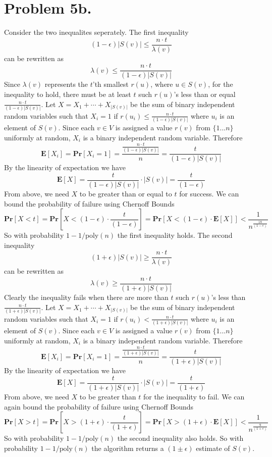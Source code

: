 \documentclass[12pt]{article}
\begin{document}
\section*{Problem 5b.}
Consider the two inequalites seperately. The first inequality
$$ (1-\epsilon)|S(v)| \le \frac{n\cdot t}{\lambda(v)} $$
can be rewritten as
$$ \lambda(v) \le \frac{n\cdot t}{(1-\epsilon)|S(v)|} $$
Since $\lambda(v)$ represents the $t$'th smallest $r(u)$, where $u \in S(v)$,
for the inequality to hold, there must be at least $t$ such
$r(u)$'s less than or equal $\frac{n\cdot t}{(1-\epsilon)|S(v)|}$. Let
$X = X_1 + \cdots + X_{|S(v)|}$ be the sum of binary independent random variables
such that $X_i = 1$ if $r(u_i) \le \frac{n\cdot t}{(1-\epsilon)|S(v)|}$ where
$u_i$ is an element of $S(v)$. Since each $v \in V$ is assigned a value $r(v)$
from $\{1...n\}$ uniformly at random, $X_i$ is a binary independent random
variable. Therefore
$$\textbf{E}[X_i] = \textbf{Pr}[X_i = 1] =
\frac{\frac{n\cdot t}{(1-\epsilon)|S(v)|}}{n} =
\frac{t}{(1-\epsilon)|S(v)|}$$
By the linearity of expectation we have
$$\textbf{E}[X] = \frac{t}{(1-\epsilon)|S(v)|}\cdot |S(v)| =
\frac{t}{(1-\epsilon)}$$
From above, we need $X$ to be greater than or equal to $t$ for success. We can
bound the probability of failure using Chernoff Bounds
$$\textbf{Pr}[X < t] = \textbf{Pr}[X < (1-\epsilon)\cdot\frac{t}{(1-\epsilon)}]=
\textbf{Pr}[X < (1-\epsilon)\cdot\textbf{E}[X]] <
\frac{1}{n^{\frac{18}{(1-\epsilon)}}}$$
So with probability $1-1/\text{poly}(n)$ the first inequality holds.
The second inequality
$$ (1+\epsilon)|S(v)| \ge \frac{n\cdot t}{\lambda(v)} $$
can be rewritten as
$$ \lambda(v) \ge \frac{n\cdot t}{(1+\epsilon)|S(v)|} $$
Clearly the inequality fails when there are more than $t$ such
$r(u)$'s less than $\frac{n\cdot t}{(1+\epsilon)|S(v)|}$. Let
$X = X_1 + \cdots + X_{|S(v)|}$ be the sum of binary independent random variables
such that $X_i = 1$ if $r(u_i) < \frac{n\cdot t}{(1+\epsilon)|S(v)|}$ where
$u_i$ is an element of $S(v)$. Since each $v \in V$ is assigned a value $r(v)$
from $\{1...n\}$ uniformly at random, $X_i$ is a binary independent random
variable. Therefore
$$\textbf{E}[X_i] = \textbf{Pr}[X_i = 1] =
\frac{\frac{n\cdot t}{(1+\epsilon)|S(v)|}}{n} =
\frac{t}{(1+\epsilon)|S(v)|}$$
By the linearity of expectation we have
$$\textbf{E}[X] = \frac{t}{(1+\epsilon)|S(v)|}\cdot |S(v)| =
\frac{t}{(1+\epsilon)}$$
From above, we need $X$ to be greater than $t$ for the inequality to fail. We
can again bound the probability of failure using Chernoff Bounds
$$\textbf{Pr}[X > t] = \textbf{Pr}[X > (1+\epsilon)\cdot\frac{t}{(1+\epsilon)}]=
\textbf{Pr}[X > (1+\epsilon)\cdot\textbf{E}[X]] <
\frac{1}{n^{\frac{9}{(1+\epsilon)}}}$$
So with probability $1-1/\text{poly}(n)$ the second inequality also holds.
So with probability $1-1/\text{poly}(n)$ the algorithm returns a
$(1 \pm \epsilon)$ estimate of $S(v)$.
\end{document}

